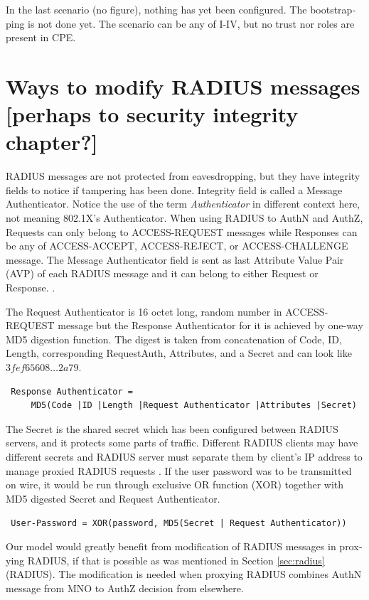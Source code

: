 \documentclass[12pt,a4paper,english]{tutthesis}
\begin{document}
\begin{otherlanguage}{english}
In the last scenario (no figure), nothing has yet been configured. The bootstrapping
is not done yet. The scenario can be any of I-IV, but no trust nor roles are present in CPE.
\section{Ways to modify RADIUS messages [perhaps to security integrity chapter?]}
\label{sec-4-7}
\label{sec:radius-macs}
RADIUS messages are not protected from eavesdropping, but they have
integrity fields to notice if tampering has been done.  
Integrity field is called a Message Authenticator.
Notice the use of the term \emph{Authenticator} in different context here, not
meaning 802.1X's Authenticator.
When using RADIUS to AuthN and AuthZ, Requests can only belong to ACCESS-REQUEST messages while
Responses can be any of ACCESS-ACCEPT, ACCESS-REJECT, or ACCESS-CHALLENGE message.
The Message Authenticator field is sent as last Attribute Value Pair (AVP)
of each RADIUS message and it can belong 
to either Request or Response. \cite[p.20]{radiusbook}.

The Request Authenticator is 16 octet long, random number in
ACCESS-REQUEST message but the Response Authenticator for it is achieved
by one-way MD5 digestion function. 
The digest is taken from concatenation of Code, ID, Length, corresponding
Request\-Auth, Attributes, and a Secret and can look like 
$3fef65608\ldots 2a79$. 
\begin{verbatim}
 Response Authenticator = 
     MD5(Code |ID |Length |Request Authenticator |Attributes |Secret)
\end{verbatim}
The Secret is the shared secret which has been configured between RADIUS servers,
and it protects some parts of traffic. 
Different RADIUS clients may have different
secrets and RADIUS server must separate them by client's IP address to
manage proxied RADIUS requests \cite{radiusbook}.
If the user password was to be transmitted on wire, it would be run
through exclusive OR function (XOR) together with MD5 digested Secret
and Request
Authenticator.
\begin{center}
{\tt 
User-Password = XOR(password, MD5(Secret | Request Authenticator))}
\end{center}



Our model would greatly benefit from modification of RADIUS messages in proxying
RADIUS, if that is possible as was mentioned in Section \ref{sec:radius}(RADIUS).
The modification is needed when proxying RADIUS combines AuthN message
from MNO to AuthZ decision from elsewhere.






\end{otherlanguage}
\end{document}
